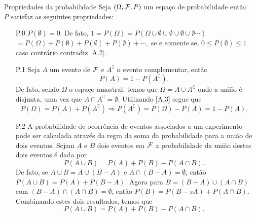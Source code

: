 \begin{frame}{Propriedades da probabilidade}
Seja $(\Omega, {\cal F}, P)$ um espaço de probabilidade então $P$ satisfaz as seguintes propriedades:

\begin{enumerate}
\item[P.0] $P(\emptyset)=0.$ De fato, $1=P(\Omega)=P(\Omega \cup \emptyset \cup \emptyset\cup \emptyset\cup \emptyset \cdots )$ $=P(\Omega)+P(\emptyset)+P(\emptyset)+P(\emptyset)+\cdots,$  se e somente se,  $0 \leq P(\emptyset)\leq 1$ caso contrário contradiz [A.2].

\item[P.1] Seja $A$ um evento de ${\cal F}$  e $A^\complement$ o evento complementar, então $$P(A) = 1 - P\left(A^\complement\right).$$ 
De fato, sendo $ \Omega $ o espaço amostral, temos que $\Omega=A\cup A^\complement$ onde a união é disjunta, uma vez que $ A\cap A^\complement=\emptyset $. Utilizando [A.3]  segue que
$$P(\Omega)=P(A)+P\left(A^\complement\right)\Rightarrow P\left(A^\complement\right)=P(\Omega)-P(A)=1-P(A).$$ 


\item[P.2] A probabilidade de ocorrência de eventos associados a um experimento pode ser calculada através da regra da soma da probabilidade para a união de dois eventos. 
Sejam $A$ e $B$  dois eventos em  ${\cal F}$ a probabilidade da união destes dois eventos  é dada por $$ P(A\cup B) = P(A)+P(B)-P(A\cap B).$$ 
De fato, se $ A\cup B=A\cup (B- A) $ e $ A\cap(B - A)=\emptyset $, então $P(A\cup B)=P(A)+P(B - A).$ Agora para $ B=(B- A)\cup(A\cap B) $ com $ (B - A)\cap(A\cap B)=\emptyset $, então
$P(B)=P(B -s A)+P(A\cap B).$ Combinando estes dois resultados, temos que \[P(A\cup B)=P(A)+P(B)-P(A\cap B).\]
\end{enumerate}
 \end{frame}

